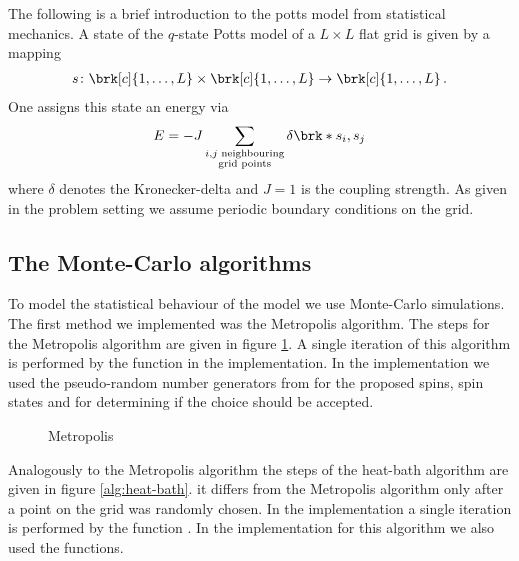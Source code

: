 The following is a brief introduction to the potts model from statistical mechanics.
A state of the $q$-state Potts model of a $L\times L$ flat grid is given by a mapping
\begin{align*}
	s\colon \brk[c]{1,\dots,L}\times\brk[c]{1,\dots,L}\to\brk[c]{1,\dots,L}\,.
\end{align*}
One assigns this state an energy via
\begin{align*}
	E = -J\sum_{\substack{i, j\text{ neighbouring}\\ \text{grid points}}}\delta\brk*{s_i,s_j}
\end{align*}
where $\delta$ denotes the Kronecker-delta and $J=1$ is the coupling strength. As given in the problem setting we assume periodic boundary conditions on the grid.

\subsection{The Monte-Carlo algorithms}

To model the statistical behaviour of the model we use Monte-Carlo simulations. 
The first method we implemented was the Metropolis algorithm.
The steps for the Metropolis algorithm are given in figure \ref{alg:Metropolis}. A single iteration of this algorithm is performed by the function  in the implementation. In the implementation we used the pseudo-random number generators from  for the proposed spins, spin states and for determining if the choice should be accepted.

\begin{figure}
\centering
\begin{algorithm}[H]
\caption{Metropolis}
\label{alg:Metropolis}

\BlankLine
{}
\end{algorithm}
\end{figure}

Analogously to the Metropolis algorithm the steps of the heat-bath algorithm are given in figure \ref{alg:heat-bath}. it differs from the Metropolis algorithm only after a point on the grid was randomly chosen. In the implementation a single iteration is performed by the function . In the implementation for this algorithm we also used the  functions.

